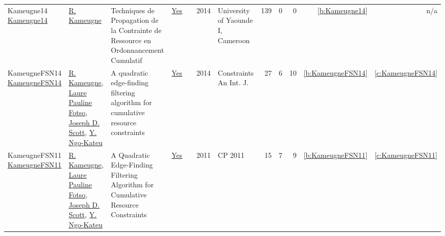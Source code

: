 {\begin{longtable}{>{\raggedright\arraybackslash}p{3cm}>{\raggedright\arraybackslash}p{6cm}>{\raggedright\arraybackslash}p{6.5cm}rrrp{2.5cm}rrrrr}
Kameugne14 \href{http://cp2013.a4cp.org/sites/default/files/roger_kameugne_-_propagation_techniques_of_resource_constraint_for_cumulative_scheduling.pdf}{Kameugne14} & \hyperref[auth:a10]{R. Kameugne} & Techniques de Propagation de la Contrainte de Ressource en Ordonnancement Cumulatif & \href{works/Kameugne14.pdf}{Yes} & \cite{Kameugne14} & 2014 & University of Yaounde I, Cameroon & 139 & 0 & 0 & \ref{b:Kameugne14} & n/a\\
KameugneFSN14 \href{https://doi.org/10.1007/s10601-013-9157-z}{KameugneFSN14} & \hyperref[auth:a10]{R. Kameugne}, \hyperref[auth:a131]{Laure Pauline Fotso}, \hyperref[auth:a132]{Joseph D. Scott}, \hyperref[auth:a133]{Y. Ngo{-}Kateu} & A quadratic edge-finding filtering algorithm for cumulative resource constraints & \href{works/KameugneFSN14.pdf}{Yes} & \cite{KameugneFSN14} & 2014 & Constraints An Int. J. & 27 & 6 & 10 & \ref{b:KameugneFSN14} & \ref{c:KameugneFSN14}\\
KameugneFSN11 \href{https://doi.org/10.1007/978-3-642-23786-7\_37}{KameugneFSN11} & \hyperref[auth:a10]{R. Kameugne}, \hyperref[auth:a131]{Laure Pauline Fotso}, \hyperref[auth:a132]{Joseph D. Scott}, \hyperref[auth:a133]{Y. Ngo{-}Kateu} & A Quadratic Edge-Finding Filtering Algorithm for Cumulative Resource Constraints & \href{works/KameugneFSN11.pdf}{Yes} & \cite{KameugneFSN11} & 2011 & CP 2011 & 15 & 7 & 9 & \ref{b:KameugneFSN11} & \ref{c:KameugneFSN11}\\
\end{longtable}
}

